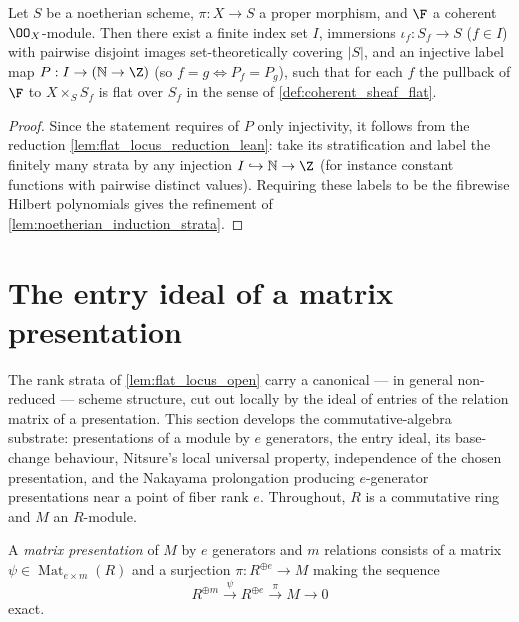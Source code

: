 \begin{lemma}\leanok
  \label{lem:flat_locus_assembly_lean}
  Let \(S\) be a noetherian scheme, \(\pi : X \to S\) a proper morphism,
  and \(\F\) a coherent \(\OO_X\)-module. Then there exist a finite index set
  \(I\), immersions \(\iota_f : S_f \to S\) (\(f \in I\)) with pairwise disjoint
  images set-theoretically covering \(|S|\), and an injective label map
  \(P : I \to (\mathbb{N} \to \Z)\) (so \(f = g \iff P_f = P_g\)), such that for
  each \(f\) the pullback of \(\F\) to \(X \times_S S_f\) is flat over \(S_f\) in
  the sense of \cref{def:coherent_sheaf_flat}.
\end{lemma}

\begin{proof}
  \leanok
  Since the statement requires of \(P\) only injectivity, it follows from the
  reduction \cref{lem:flat_locus_reduction_lean}: take its stratification and
  label the finitely many strata by any injection
  \(I \hookrightarrow \mathbb{N} \to \Z\) (for instance constant functions
  with pairwise distinct values).  Requiring these labels to be the fibrewise
  Hilbert polynomials gives the refinement of
  \cref{lem:noetherian_induction_strata}.
\end{proof}

\section{The entry ideal of a matrix presentation}
\label{sec:entry_ideal}

The rank strata of \cref{lem:flat_locus_open} carry a canonical --- in
general non-reduced --- scheme structure, cut out locally by the ideal of
entries of the relation matrix of a presentation.  This section develops the
commutative-algebra substrate: presentations of a module by \(e\)
generators, the entry ideal, its base-change behaviour, Nitsure's local
universal property, independence of the chosen presentation, and the
Nakayama prolongation producing \(e\)-generator presentations near a point
of fiber rank \(e\).  Throughout, \(R\) is a commutative ring and \(M\) an
\(R\)-module.

\begin{definition}
  \label{def:matrix_presentation}
  \leanok
  A \emph{matrix presentation} of \(M\) by \(e\) generators and \(m\)
  relations consists of a matrix
  \(\psi \in \operatorname{Mat}_{e \times m}(R)\) and a surjection
  \(\pi : R^{\oplus e} \to M\) making the sequence
  \[
    R^{\oplus m} \xrightarrow{\ \psi\ } R^{\oplus e}
      \xrightarrow{\ \pi\ } M \to 0
  \]
  exact.
\end{definition}

